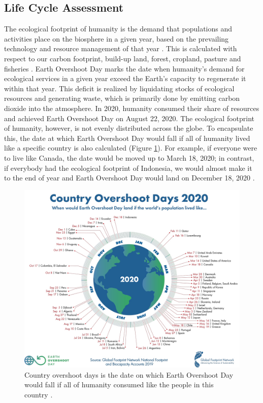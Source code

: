 \documentclass{article}
\begin{document}
\subsection{Life Cycle Assessment}
The ecological footprint of humanity is the demand that populations and activities place on the biosphere in a given year, based on the prevailing technology and resource management of that year \cite{borucke2013accounting}. This is calculated with respect to our carbon footprint, build-up land, forest, cropland, pasture and fisheries \cite{ecologicalfootprint2021}. Earth Overshoot Day marks the date when humanity's demand for ecological services in a given year exceed the Earth's capacity to regenerate it within that year. This deficit is realized by liquidating stocks of ecological resources and generating waste, which is primarily done by emitting carbon dioxide into the atmosphere. In 2020, humanity consumed their share of resources and achieved Earth Overshoot Day on August 22, 2020. The ecological footprint of humanity, however, is not evenly distributed across the globe. To encapsulate this, the date at which Earth Overshoot Day would fall if all of humanity lived like a specific country is also calculated (Figure \ref{Country_Overshoot_Days}). For example, if everyone were to live like Canada, the date would be moved up to March 18, 2020; in contrast, if everybody had the ecological footprint of Indonesia, we would almost make it to the end of year and Earth Overshoot Day would land on December 18, 2020 \cite{earthovershoot2020}.

 \begin{figure}[h]
    \includegraphics[width=.97 \textwidth]{./images/country_overshoot_days_2020.jpg}
    \centering
    \caption{Country overshoot days is the date on which Earth Overshoot Day would fall if all of humanity consumed like the people in this country \cite{earthovershoot2020}.}
    \label{Country_Overshoot_Days}
\end{figure}
\end{document}
